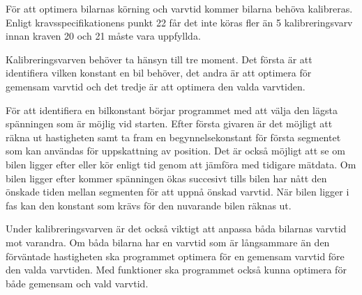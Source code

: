 För att optimera bilarnas körning och varvtid kommer bilarna behöva
kalibreras. Enligt kravsspecifikationens punkt 22 får det inte köras fler än
5 kalibreringsvarv innan kraven 20 och 21 måste vara uppfyllda.

Kalibreringsvarven behöver ta hänsyn till tre moment. Det första är att
identifiera vilken konstant en bil behöver, det andra är att optimera för
gemensam varvtid och det tredje är att optimera den valda varvtiden.

För att identifiera en bilkonstant börjar programmet med att välja den lägsta spänningen som är möjlig vid starten. Efter första givaren är det möjligt att räkna ut hastigheten samt ta fram en begynnelsekonstant för första segmentet som kan användas för uppskattning av position. Det är också möjligt att se om bilen ligger efter eller kör enligt tid genom att jämföra med tidigare mätdata. Om bilen ligger efter kommer spänningen ökas succesivt tills bilen har nått den önskade tiden mellan segmenten för att uppnå önskad varvtid. När bilen ligger i fas kan den konstant som krävs för den nuvarande bilen räknas ut.

Under
kalibreringsvarven är det också viktigt att anpassa båda bilarnas varvtid mot
varandra. Om båda bilarna har en varvtid som är långsammare än den förväntade
hastigheten ska programmet optimera för en gemensam varvtid före den valda
varvtiden. Med funktioner ska programmet också kunna optimera för både
gemensam och vald varvtid.

